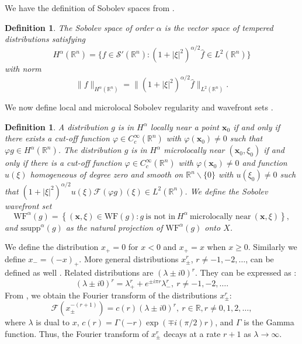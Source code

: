 \documentclass[11pt]{article}
\newcommand{\be}{\begin{equation}}
\newcommand{\ee}{\end{equation}}
\newcommand{\WF}{\mathrm{WF}}
\newcommand{\br}{\mathbb{R}}
\newcommand{\al}{\alpha}
\numberwithin{equation}{section}
\newcommand{\vx}{\mathbf{x}}
\newtheorem{definition}[theorem]{Definition}
\theoremstyle{definition}
\begin{document}
We have the definition of Sobolev spaces from \cite[page 200]{natterer}.

\begin{definition}\label{sobo_spaces}
The Sobolev space of order $\al$ is the vector space of tempered distributions satisfying
\be
H^\al(\br^n) = \{f\in \mathcal{S}'(\br^n) : (1 + |\xi|^2)^{\al/2} \hat{f} \in L^2(\br^n)\}
\ee
with norm 
\be\label{HRnnorm}
\|f\|_{H^{\al}(\br^n)} = \|(1 + |\xi|^2)^{\al/2} \hat{f}\|_{L^2(\br^n)}.
\ee
\end{definition}

\noindent We now define local and microlocal Sobolev regularity and wavefront sets \cite{Q1993sing}.

\begin{definition} \label{def:SobolevWF}
A distribution $g$ is in $H^{\al}$ locally near a point $\vx_0$ if and only if there exists a cut-off function $\varphi \in C_c^{\infty}(\br^n)$ with $\varphi(\vx_0) \neq 0$ such that $\varphi g \in H^{\al}(\br^n)$. The distribution $g$ is in $H^{\al}$ microlocally near $(\vx_0,\xi_0)$ if and only if there is a cut-off function $\varphi \in C^{\infty}_c(\br^n)$ with $\varphi(\vx_0) \neq 0$ and function $u(\xi)$ homogeneous of degree zero and smooth on $\br^n\backslash \{0\}$ with $u(\xi_0)\neq 0$ such that $(1+|\xi|^2)^{\al/2}u(\xi)\mathcal{F}(\varphi g)(\xi) \in L^2(\br^n)$. We define the Sobolev wavefront set
\be
\WF^{\al}(g) = \left\{ (\vx,\xi) \in \WF(g) : g\ \text{is not in}\ H^{\al}\ \text{microlocally near}\ (\vx, \xi) \right\},
\ee
and $\text{ssupp}^{\al}(g)$ as the natural projection of $\WF^{\al}(g)$ onto $X$.
\end{definition}

We define the distribution $x_+ = 0 $ for $x < 0$ and $x_+ = x$ when $x\geq 0$. Similarly we define $x_- = (-x)_+$. More general distributions $x_\pm^r$, $r\not=-1,-2,\dots$, can be defined as well \cite[Section 3.2, Chapter I]{gs}. Related distributions are $(\lambda \pm i0)^r$. They can be expressed as \cite[eqs. (3), (4), Section 3.6, Chapter I]{gs}:
$$
(\lambda \pm i0)^r = \lambda_+^r + e^{\pm i\pi r } \lambda_-^r,\ r\not=-1,-2,\dots.
$$
From \cite[Entries 21 and 24, Table of Fourier Transforms]{gs}, we obtain the Fourier transform of the distributions $x_\pm^r$:
\be
\label{equ_dist}
\mathcal{F} (x_\pm^{-(r+1)}) = c(r)(\lambda \pm i0)^r,\ r\in\br,r\not=0,1,2,\dots,
\ee
where $\lambda$ is dual to $x$, $c(r) = \Gamma(-r)\exp(\mp i(\pi/2)r)$, and $\Gamma$ is the Gamma function. Thus, the Fourier transform of $x_\pm^r$ decays at a rate $r+1$ as $\lambda \to \infty$.
\end{document}
